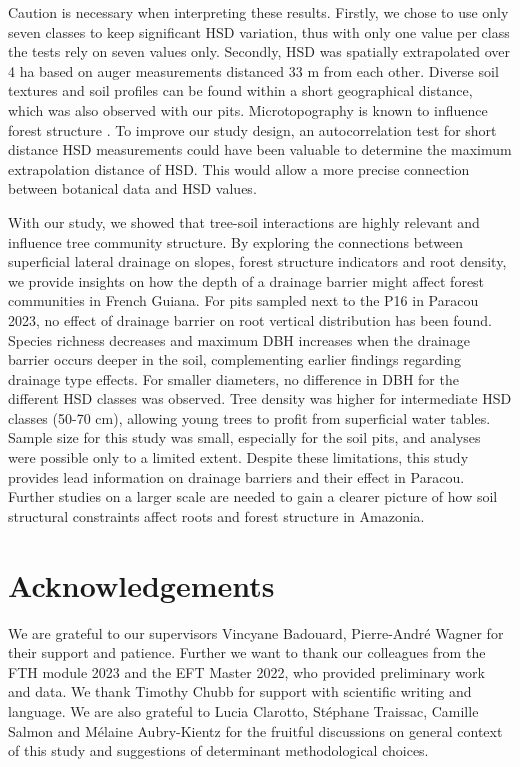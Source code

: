 \documentclass[fleqn,11pt]{latex/stylish_article} %
\begin{document}
Caution is necessary when interpreting these results. Firstly, we chose to use only seven classes to keep significant HSD variation, thus with only one value per class the tests rely on seven values only. Secondly, HSD was spatially extrapolated over 4 ha based on auger measurements distanced 33 m from each other. Diverse soil textures and soil profiles can be found within a short geographical distance, which was also observed with our pits. Microtopography is known to influence forest structure \citep{schwartzTopographyTraitsModulate2020}. To improve our study design, an autocorrelation test for short distance HSD measurements could have been valuable to determine the maximum extrapolation distance of HSD. This would allow a more precise connection between botanical data and HSD values.

With our study, we showed that tree-soil interactions are highly relevant and influence tree community structure. By exploring the connections between superficial lateral drainage on slopes, forest structure indicators and root density, we provide insights on how the depth of a drainage barrier might affect forest communities in French Guiana. For pits sampled next to the P16 in Paracou 2023, no effect of drainage barrier on root vertical distribution has been found. Species richness decreases and maximum DBH increases when the drainage barrier occurs deeper in the soil, complementing earlier findings regarding drainage type effects. For smaller diameters, no difference in DBH for the different HSD classes was observed. Tree density was higher for intermediate HSD classes (50-70 cm), allowing young trees to profit from superficial water tables. Sample size for this study was small, especially for the soil pits, and analyses were possible only to a limited extent. Despite these limitations, this study provides lead information on drainage barriers and their effect in Paracou. Further studies on a larger scale are needed to gain a clearer picture of how soil structural constraints affect roots and forest structure in Amazonia.

\hypertarget{acknowledgements}{%
\section{Acknowledgements}\label{acknowledgements}}

We are grateful to our supervisors Vincyane Badouard, Pierre-André Wagner for their support and patience. Further we want to thank our colleagues from the FTH module 2023 and the EFT Master 2022, who provided preliminary work and data. We thank Timothy Chubb for support with scientific writing and language. We are also grateful to Lucia Clarotto, Stéphane Traissac, Camille Salmon and Mélaine Aubry-Kientz for the fruitful discussions on general context of this study and suggestions of determinant methodological choices.
\end{document}
